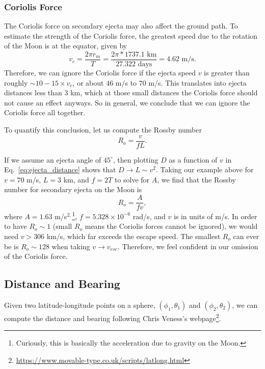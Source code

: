 \documentclass{hitec}
\begin{document}
\subsubsection{Coriolis Force}
The Coriolis force on secondary ejecta may also affect the ground path. To estimate the strength of the Coriolis force, the greatest speed due to the rotation of the Moon is at the equator, given by
\begin{equation}
v_c = \frac{2\pi r_m}{T} = \frac{2\pi * 1737.1 \text{ km}}{27.322 \text{ days}} = 4.62 \text{ m/s}.
\end{equation}
Therefore, we can ignore the Coriolis force if the ejecta speed $v$ is greater than roughly  $\sim10-15\times v_c$, or about $46$ m/s to $70$ m/s. This translates into ejecta distances less than $3$ km, which at those small distances the Coriolis force should not cause an effect anyways. So in general, we conclude that we can ignore the Coriolis force all together.

To quantify this conclusion, let us compute the Rossby number
\begin{equation}
R_o = \frac{v}{fL}.
\end{equation}

If we assume an ejecta angle of $45^\circ$, then plotting $D$ as a function of $v$ in Eq.\ \ref{eq:ejecta_distance} shows that $D \rightarrow L\sim v^2$. Taking our example above for $v=70$ m/s, $L = 3$ km, and $f = 2T$ to solve for $A$, we find that the Rossby number for secondary ejecta on the Moon is
\begin{equation}
R_o = \frac{A}{fv},
\end{equation}
where $A = 1.63$ m/s$^{2,}$\footnote{Curiously, this is basically the acceleration due to gravity on the Moon.}, $f = 5.328\times 10^{-6}$ rad/s, and $v$ is in units of m/s. In order to have $R_o\sim 1$ (small $R_o$ means the Coriolis forces cannot be ignored), we would need $v > 306$ km/s, which far exceeds the escape speed. The smallest $R_o$ can ever be is $R_o \sim 128$ when taking $v\to v_{esc}$. Therefore, we feel confident in our omission of the Coriolis force.

\subsection{Distance and Bearing}\label{ssec:Distance_and_Bearing}

Given two latitude-longitude points on a sphere, $(\phi_1, \theta_1)$ and $(\phi_2, \theta_2)$, we can compute the distance and bearing following Chris Veness's webpage\footnote{\url{https://www.movable-type.co.uk/scripts/latlong.html}}.
\end{document}
